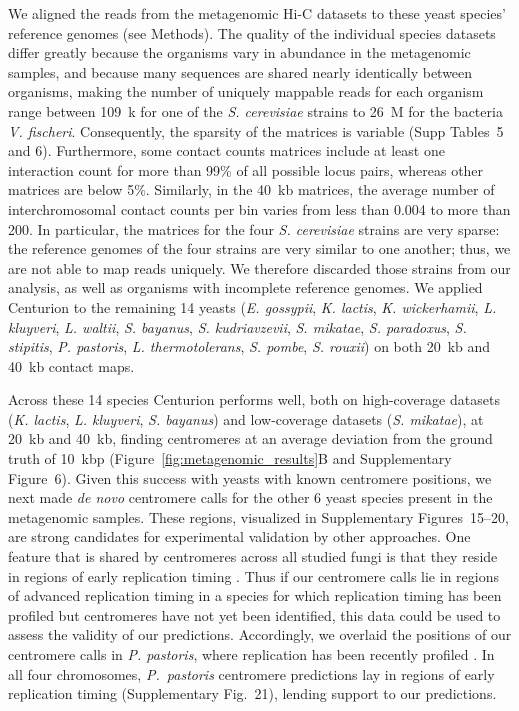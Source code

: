 We aligned the reads from the metagenomic Hi-C datasets to these yeast
species' reference genomes (see Methods). The quality of the individual
species datasets differ greatly because the organisms vary in abundance in the
metagenomic samples, and because many sequences are shared nearly identically
between organisms, making the number of uniquely mappable reads for each
organism range between 109~k for one of the \textit{S. cerevisiae} strains to
26~M for the bacteria \textit{V. fischeri}. Consequently, the sparsity of the
matrices is variable (Supp Tables~5 and
6). Furthermore, some contact counts matrices include at
least one interaction count for more than 99\% of all possible locus pairs,
whereas other matrices are below 5\%. Similarly, in the 40~kb matrices, the
average number of interchromosomal contact counts per bin varies from less
than 0.004 to more than 200. In particular, the matrices for the four
\textit{S. cerevisiae} strains are very sparse: the reference genomes of the
four strains are very similar to one another; thus, we are not able to map
reads uniquely. We therefore discarded those strains from our analysis, as
well as organisms with incomplete reference genomes. We applied Centurion to
the remaining 14 yeasts (\textit{E. gossypii}, \textit{K. lactis}, \textit{K.
wickerhamii}, \textit{L. kluyveri}, \textit{L. waltii}, \textit{S. bayanus},
\textit{S. kudriavzevii}, \textit{S. mikatae}, \textit{S. paradoxus},
\textit{S. stipitis}, \textit{P. pastoris}, \textit{L. thermotolerans},
\textit{S. pombe}, \textit{S. rouxii}) on both 20~kb and 40~kb contact maps.

Across these 14 species Centurion performs well, both on high-coverage
datasets (\textit{K. lactis}, \textit{L. kluyveri}, \textit{S. bayanus}) and
low-coverage datasets (\textit{S. mikatae}), at 20~kb and 40~kb, finding
centromeres at an average deviation from the ground truth of 10~kbp
(Figure~\ref{fig:metagenomic_results}B and Supplementary Figure~6).
Given this success with yeasts with
known centromere positions, we next made \textit{de novo} centromere calls for the
other 6 yeast species present in the metagenomic samples. These regions,
visualized in Supplementary Figures~15--20, are strong candidates for
experimental validation by other approaches. One feature that is shared by
centromeres across all studied fungi is that they reside in regions of early
replication timing \citep{koren:epigenetically, pohl:functional}. Thus if our
centromere calls lie in regions of advanced replication timing in a species
for which replication timing has been profiled but centromeres have not
yet been identified, this data could be used to assess the validity of
our predictions. Accordingly, we
overlaid the positions of our centromere calls in \textit{P. pastoris}, where
replication has been recently profiled \citep{liachko:gc-rich}. In all four
chromosomes, \textit{P.\ pastoris} centromere predictions lay in regions of
early replication timing (Supplementary Fig.~21),
lending support to our predictions.

